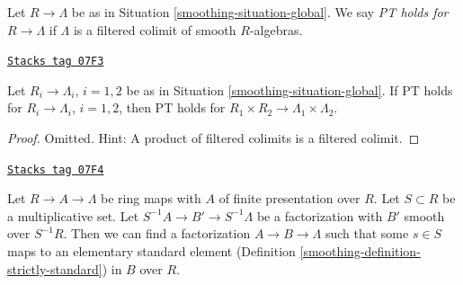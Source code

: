 Let $R \to \Lambda$ be as in Situation \ref{smoothing-situation-global}.
We say {\it PT holds for $R \to \Lambda$} if $\Lambda$ is a
filtered colimit of smooth $R$-algebras.

\begin{lemma}[Product]
\label{smoothing-lemma-product}
\href{https://stacks.math.columbia.edu/tag/07F3}{\texttt{Stacks tag 07F3}}

Let $R_i \to \Lambda_i$, $i = 1, 2$ be as in Situation \ref{smoothing-situation-global}.
If PT holds for $R_i \to \Lambda_i$, $i = 1, 2$, then PT holds for
$R_1 \times R_2 \to \Lambda_1 \times \Lambda_2$.
\end{lemma}

\begin{proof}
Omitted. Hint: A product of filtered colimits is a filtered colimit.
\end{proof}

\begin{lemma}
\label{smoothing-lemma-delocalize-base}
\href{https://stacks.math.columbia.edu/tag/07F4}{\texttt{Stacks tag 07F4}}

Let $R \to A \to \Lambda$ be ring maps with $A$ of finite presentation
over $R$. Let $S \subset R$ be a multiplicative
set. Let $S^{-1}A \to B' \to S^{-1}\Lambda$ be a factorization with
$B'$ smooth over $S^{-1}R$. Then we can find a factorization
$A \to B \to \Lambda$ such that some $s \in S$ maps to an
elementary standard element (Definition \ref{smoothing-definition-strictly-standard})
in $B$ over $R$.
\end{lemma}

